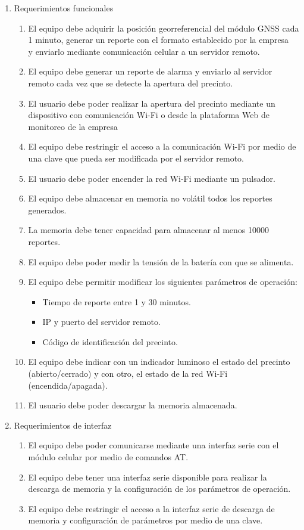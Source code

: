\documentclass[
11pt, %
]{charter}
\begin{document}
\begin{enumerate}
	\item Requerimientos funcionales
		\begin{enumerate}
			\item El equipo debe adquirir la posición georreferencial del módulo GNSS cada 1 minuto, generar un reporte con el formato establecido por la empresa \empclientename\, y enviarlo mediante comunicación celular a un servidor remoto.
			\item El equipo debe generar un reporte de alarma y enviarlo al servidor remoto cada vez que se detecte la apertura del precinto.
			\item El usuario debe poder realizar la apertura del precinto mediante un dispositivo con comunicación Wi-Fi o desde la plataforma Web de monitoreo de la empresa \empclientename
			\item El equipo debe restringir el acceso a la comunicación Wi-Fi por medio de una clave que pueda ser modificada por el servidor remoto.
			\item El usuario debe poder encender la red Wi-Fi mediante un pulsador.
			\item El equipo debe almacenar en memoria no volátil todos los reportes generados.
			\item La memoria debe tener capacidad para almacenar al menos 10000 reportes. 
			\item El equipo debe poder medir la tensión de la batería con que se alimenta.
			\item El equipo debe permitir modificar los siguientes parámetros de operación:
			\begin{itemize}
				\item Tiempo de reporte entre 1 y 30 minutos.
				\item IP y puerto del servidor remoto.
				\item Código de identificación del precinto.
			\end{itemize}
			\item El equipo debe indicar con un indicador luminoso el estado del precinto (abierto/cerrado) y con otro, el estado de la red Wi-Fi (encendida/apagada).			
			\item El usuario debe poder descargar la memoria almacenada.
		\end{enumerate}
		
	\item Requerimientos de interfaz
		\begin{enumerate}
			\item El equipo debe poder comunicarse mediante una interfaz serie con el módulo celular por medio de comandos AT.
			\item El equipo debe tener una interfaz serie disponible para realizar la descarga de memoria y la configuración de los parámetros de operación.
			\item El equipo debe restringir el acceso a la interfaz serie de descarga de memoria y configuración de parámetros por medio de una clave.
		\end{enumerate}
		

\end{enumerate}
\end{document}
